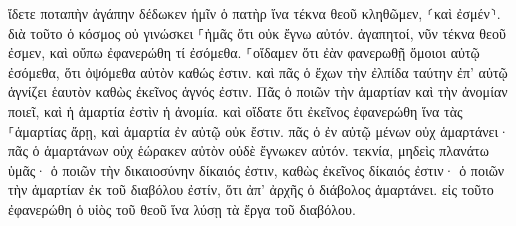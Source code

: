 \documentclass{openreader}
\begin{document}
ἴδετε ποταπὴν ἀγάπην δέδωκεν ἡμῖν ὁ πατὴρ ἵνα τέκνα θεοῦ κληθῶμεν, ⸂καὶ ἐσμέν⸃. διὰ τοῦτο ὁ κόσμος οὐ γινώσκει ⸀ἡμᾶς ὅτι οὐκ ἔγνω αὐτόν. 
ἀγαπητοί, νῦν τέκνα θεοῦ ἐσμεν, καὶ οὔπω ἐφανερώθη τί ἐσόμεθα. ⸀οἴδαμεν ὅτι ἐὰν φανερωθῇ ὅμοιοι αὐτῷ ἐσόμεθα, ὅτι ὀψόμεθα αὐτὸν καθώς ἐστιν. 
καὶ πᾶς ὁ ἔχων τὴν ἐλπίδα ταύτην ἐπ’ αὐτῷ ἁγνίζει ἑαυτὸν καθὼς ἐκεῖνος ἁγνός ἐστιν. 
Πᾶς ὁ ποιῶν τὴν ἁμαρτίαν καὶ τὴν ἀνομίαν ποιεῖ, καὶ ἡ ἁμαρτία ἐστὶν ἡ ἀνομία. 
καὶ οἴδατε ὅτι ἐκεῖνος ἐφανερώθη ἵνα τὰς ⸀ἁμαρτίας ἄρῃ, καὶ ἁμαρτία ἐν αὐτῷ οὐκ ἔστιν. 
πᾶς ὁ ἐν αὐτῷ μένων οὐχ ἁμαρτάνει· πᾶς ὁ ἁμαρτάνων οὐχ ἑώρακεν αὐτὸν οὐδὲ ἔγνωκεν αὐτόν. 
τεκνία, μηδεὶς πλανάτω ὑμᾶς· ὁ ποιῶν τὴν δικαιοσύνην δίκαιός ἐστιν, καθὼς ἐκεῖνος δίκαιός ἐστιν· 
ὁ ποιῶν τὴν ἁμαρτίαν ἐκ τοῦ διαβόλου ἐστίν, ὅτι ἀπ’ ἀρχῆς ὁ διάβολος ἁμαρτάνει. εἰς τοῦτο ἐφανερώθη ὁ υἱὸς τοῦ θεοῦ ἵνα λύσῃ τὰ ἔργα τοῦ διαβόλου. 
\end{document}
